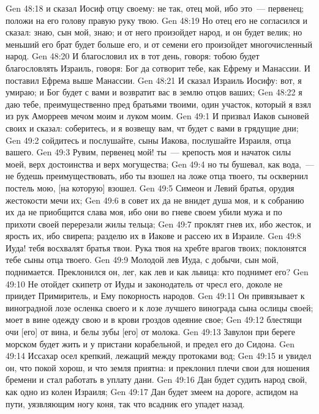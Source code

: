 \vs Gen 48:18 и сказал Иосиф отцу своему: не так, отец мой, ибо это~--- первенец; положи на его голову правую руку твою.
\vs Gen 48:19 Но отец его не согласился и сказал: знаю, сын мой, знаю; и от него произойдет народ, и он будет велик; но меньший его брат будет больше его, и от семени его произойдет многочисленный народ.
\vs Gen 48:20 И благословил их в тот день, говоря: тобою будет благословлять Израиль, говоря: Бог да сотворит тебе, как Ефрему и Манассии. И поставил Ефрема выше Манассии.
\vs Gen 48:21 И сказал Израиль Иосифу: вот, я умираю; и Бог будет с вами и возвратит вас в землю отцов ваших;
\vs Gen 48:22 я даю тебе, преимущественно пред братьями твоими, один участок, который я взял из рук Аморреев мечом моим и луком моим.
\vs Gen 49:1 И призвал Иаков сыновей своих и сказал: соберитесь, и я возвещу вам, чт будет с вами в грядущие дни;
\vs Gen 49:2 сойдитесь и послушайте, сыны Иакова, послушайте Израиля, отца вашего.
\rsbpar\vs Gen 49:3 Рувим, первенец мой! ты~--- крепость моя и начаток силы моей, верх достоинства и верх могущества;
\vs Gen 49:4 но ты бушевал, как вода,~--- не будешь преимуществовать, ибо ты взошел на ложе отца твоего, ты осквернил постель мою, [на которую] взошел.
\rsbpar\vs Gen 49:5 Симеон и Левий братья, орудия жестокости мечи их;
\vs Gen 49:6 в совет их да не внидет душа моя, и к собранию их да не приобщится слава моя, ибо они во гневе своем убили мужа и по прихоти своей перерезали жилы тельца;
\vs Gen 49:7 проклят гнев их, ибо жесток, и ярость их, ибо свирепа; разделю их в Иакове и рассею их в Израиле.
\rsbpar\vs Gen 49:8 Иуда! тебя восхвалят братья твои. Рука твоя на хребте врагов твоих; поклонятся тебе сыны отца твоего.
\vs Gen 49:9 Молодой лев Иуда, с добычи, сын мой, поднимается. Преклонился он, лег, как лев и как львица: кто поднимет его?
\vs Gen 49:10 Не отойдет скипетр от Иуды и законодатель от чресл его, доколе не приидет Примиритель, и Ему покорность народов.
\vs Gen 49:11 Он привязывает к виноградной лозе осленка своего и к лозе лучшего винограда сына ослицы своей; моет в вине одежду свою и в крови гроздов одеяние свое;
\vs Gen 49:12 блестящи очи [его] от вина, и белы зубы [его] от молока.
\rsbpar\vs Gen 49:13 Завулон при береге морском будет жить и у пристани корабельной, и предел его до Сидона.
\rsbpar\vs Gen 49:14 Иссахар осел крепкий, лежащий между протоками вод;
\vs Gen 49:15 и увидел он, что покой хорош, и что земля приятна: и преклонил плечи свои для ношения бремени и стал работать в уплату дани.
\rsbpar\vs Gen 49:16 Дан будет судить народ свой, как одно из колен Израиля;
\vs Gen 49:17 Дан будет змеем на дороге, аспидом на пути, уязвляющим ногу коня, так что всадник его упадет назад.

